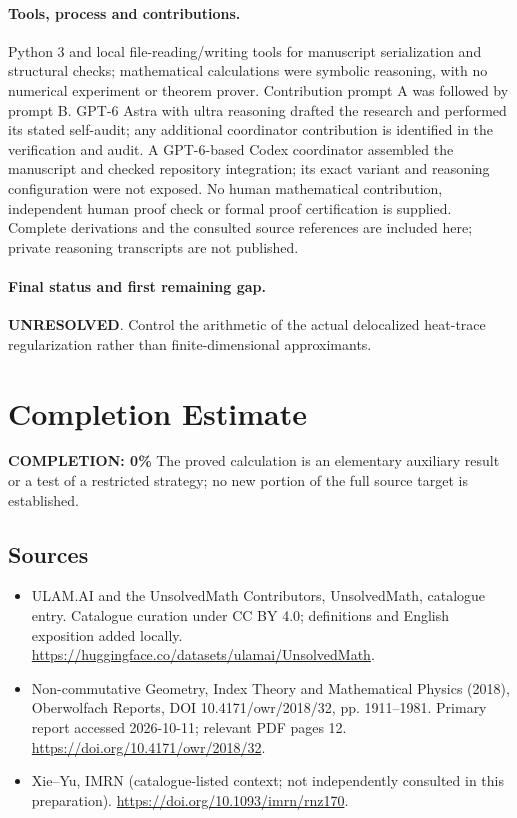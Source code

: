 \documentclass[11pt]{article}
\begin{document}
\paragraph{Tools, process and contributions.}
Python 3 and local file-reading/writing tools for manuscript serialization and structural checks; mathematical calculations were symbolic reasoning, with no numerical experiment or theorem prover. Contribution prompt A was followed by prompt B. GPT-6 Astra with ultra reasoning drafted the research and performed its stated self-audit; any additional coordinator contribution is identified in the verification and audit. A GPT-6-based Codex coordinator assembled the manuscript and checked repository integration; its exact variant and reasoning configuration were not exposed. No human mathematical contribution, independent human proof check or formal proof certification is supplied. Complete derivations and the consulted source references are included here; private reasoning transcripts are not published.

\paragraph{Final status and first remaining gap.}
\textbf{UNRESOLVED}. Control the arithmetic of the actual delocalized heat-trace regularization rather than finite-dimensional approximants.

\section{Completion Estimate}
\noindent\textbf{COMPLETION: 0\%}
The proved calculation is an elementary auxiliary result or a test of a restricted strategy; no new portion of the full source target is established.

\subsection{Sources}
\begin{itemize}
\item[\hypertarget{source:statement:1}{S1}] ULAM.AI and the UnsolvedMath Contributors, UnsolvedMath, catalogue entry. Catalogue curation under CC BY 4.0; definitions and English exposition added locally.
\url{https://huggingface.co/datasets/ulamai/UnsolvedMath}.
\item[\hypertarget{source:statement:2}{S2}] Non-commutative Geometry, Index Theory and Mathematical Physics (2018), Oberwolfach Reports, DOI 10.4171/owr/2018/32, pp. 1911--1981. Primary report accessed 2026-10-11; relevant PDF pages 12.
\url{https://doi.org/10.4171/owr/2018/32}.
\item[\hypertarget{source:statement:3}{S3}] Xie--Yu, IMRN (catalogue-listed context; not independently consulted in this preparation).
\url{https://doi.org/10.1093/imrn/rnz170}.
\end{itemize}
\label{end:statement}
\end{document}
